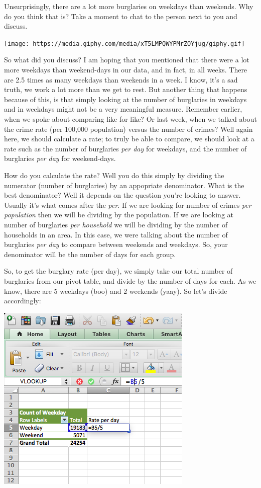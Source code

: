 \documentclass[]{book}
\theoremstyle{definition}
\theoremstyle{definition}
\theoremstyle{definition}
\theoremstyle{remark}
\begin{document}
Unsurprisingly, there are a lot more burglaries on weekdays than
weekends. Why do you think that is? Take a moment to chat to the person
next to you and discuss.

\texttt{[image: https://media.giphy.com/media/xT5LMPQWYPMrZOYjug/giphy.gif]}

So what did you discuss? I am hoping that you mentioned that there were
a lot more weekdays than weekend-days in our data, and in fact, in all
weeks. There are 2.5 times as many weekdays than weekends in a week. I
know, it's a sad truth, we work a lot more than we get to rest. But
another thing that happens because of this, is that simply looking at
the number of burglaries in weekdays and in weekdays might not be a very
meaningful measure. Remember earlier, when we spoke about comparing like
for like? Or last week, when we talked about the crime rate (per 100,000
population) versus the number of crimes? Well again here, we should
calculate a rate; to truly be able to compare, we should look at a rate
such as the number of burglaries \emph{per day} for weekdays, and the
number of burglaries \emph{per day} for weekend-days.

How do you calculate the rate? Well you do this simply by dividing the
numerator (number of burglaries) by an appopriate denominator. What is
the best denominator? Well it depends on the question you're looking to
answer. Usually it's what comes after the \emph{per}. If we are looking
for number of crimes \emph{per population} then we will be dividing by
the population. If we are looking at number of burglaries \emph{per
household} we will be dividing by the number of households in an area.
In this case, we were talking about the number of burglaries \emph{per
day} to compare between weekends and weekdays. So, your denominator will
be the number of days for each group.

So, to get the burglary rate (per day), we simply take our total number
of burglaries from our pivot table, and divide by the number of days for
each. As we know, there are 5 weekdays (boo) and 2 weekends (yaay). So
let's divide accordingly:

\includegraphics{imgs/burg_1.png}
\end{document}
